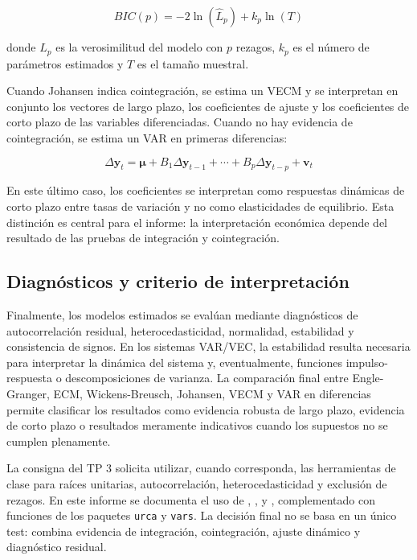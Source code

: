 \documentclass[11pt,a4paper]{article}
\begin{document}
	\begin{equation}
		BIC(p) = -2\ln(\widehat{L}_p) + k_p\ln(T)
		\label{eq:tp3-bic}
	\end{equation}
	
	donde \(\widehat{L}_p\) es la verosimilitud del modelo con \(p\) rezagos,
	\(k_p\) es el número de parámetros estimados y \(T\) es el tamaño muestral.
	
	Cuando Johansen indica cointegración, se estima un VECM y se interpretan en
	conjunto los vectores de largo plazo, los coeficientes de ajuste y los
	coeficientes de corto plazo de las variables diferenciadas. Cuando no hay
	evidencia de cointegración, se estima un VAR en primeras diferencias:
	
	\begin{equation}
		\Delta \mathbf{y}_t
		= \boldsymbol{\mu}
		+ B_1\Delta \mathbf{y}_{t-1}
		+ \cdots
		+ B_p\Delta \mathbf{y}_{t-p}
		+ \mathbf{v}_t
		\label{eq:tp3-var-diferencias}
	\end{equation}
	
	En este último caso, los coeficientes se interpretan como respuestas dinámicas
	de corto plazo entre tasas de variación y no como elasticidades de equilibrio.
	Esta distinción es central para el informe: la interpretación económica depende
	del resultado de las pruebas de integración y cointegración.
	
	\subsection{Diagnósticos y criterio de interpretación}
	\label{subsec:metodologia-diagnosticos}
	
	Finalmente, los modelos estimados se evalúan mediante diagnósticos de
	autocorrelación residual, heterocedasticidad, normalidad, estabilidad y
	consistencia de signos. En los sistemas VAR/VEC, la estabilidad resulta
	necesaria para interpretar la dinámica del sistema y, eventualmente, funciones
	impulso-respuesta o descomposiciones de varianza. La comparación final entre
	Engle-Granger, ECM, Wickens-Breusch, Johansen, VECM y VAR en diferencias
	permite clasificar los resultados como evidencia robusta de largo plazo,
	evidencia de corto plazo o resultados meramente indicativos cuando los supuestos
	no se cumplen plenamente.
	
	La consigna del TP 3 solicita utilizar, cuando corresponda, las herramientas de
	clase para raíces unitarias, autocorrelación, heterocedasticidad y exclusión de
	rezagos. En este informe se documenta el uso de ,
	,  y
	, complementado con funciones de los paquetes
	\texttt{urca} y \texttt{vars}. La decisión final no se basa en un único test:
	combina evidencia de integración, cointegración, ajuste dinámico y diagnóstico
	residual.
	
\end{document}
